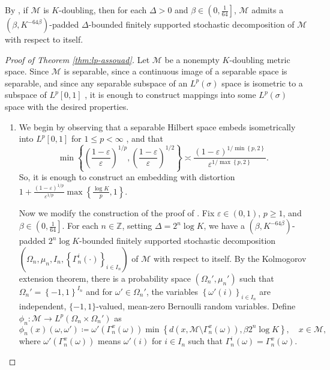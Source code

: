 \documentclass[11pt,reqno]{amsart}
\newcommand{\1}{\mathbf 1}
\begin{document}
By \cite[Lemma 2.2]{naor2012assouad}, if $\mathcal{M}$ is $K$-doubling, then for each $\Delta>0$ and $\beta\in \left(0,\frac{1}{64}\right]$, $\mathcal{M}$ admits a $\left(\beta,K^{-64\beta}\right)$-padded $\Delta$-bounded finitely supported stochastic decomposition of $\mathcal{M}$ with respect to itself.

\begin{proof}[Proof of Theorem \ref{thm:lp-assouad}]
Let $\mathcal{M}$ be a nonempty $K$-doubling metric space. Since $\mathcal{M}$ is separable, since a continuous image of a separable space is separable, and since any separable subspace of an $L^p\left(\sigma\right)$ space is isometric to a subspace of $L^p\left[0,1\right]$ \cite[Fact 1.20]{ostrovskii2013metric}, it is enough to construct mappings into some $L^p(\sigma)$ space with the desired properties.

\begin{enumerate}
    \item 
    We begin by observing that a separable Hilbert space embeds isometrically into $L^p[0,1]$ for $1\le p<\infty$ \cite[Proposition 6.4.13]{albiac2006topics}, and that
\[
\min\left\{\left(\frac{1-\varepsilon}{\varepsilon}\right)^{1/p},\left(\frac{1-\varepsilon}{\varepsilon}\right)^{1/2}\right\}\asymp \frac{(1-\varepsilon)^{1/\min\left\{p,2\right\}}}{\varepsilon^{1/\max\left\{p,2\right\}}}.
\]
So, it is enough to construct an embedding with distortion $1+\frac{\left(1-\varepsilon\right)^{1/p}}{\varepsilon^{1/p}}\max\left\{\frac{\log K}{p},1\right\}$.


Now we modify the construction of the proof of \cite[Theorem 5.1]{lee2005metric}. Fix $\varepsilon\in \left(0,1\right)$, $p\ge 1$, and $\beta\in \left(0,\frac{1}{64}\right]$. For each $n\in \mathbb{Z}$, setting $\Delta=2^n\log K$, we have a $\left(\beta,K^{-64\beta}\right)$-padded $2^n\log K$-bounded finitely supported stochastic decomposition $\left(\Omega_n,\mu_n,I_n,\left\{\Gamma_n^i\left(\cdot\right)\right\}_{i\in I_n}\right)$ of $\mathcal{M}$ with respect to itself. By the Kolmogorov extension theorem, there is a probability space $\left(\Omega_n',\mu_n'\right)$ such that $\Omega_n'=\left\{-1,1\right\}^{I_n}$ and for $\omega'\in \Omega_n'$, the variables $\left\{\omega'\left(i\right)\right\}_{i\in I_n}$ are independent, $\{-1,1\}$-valued, mean-zero Bernoulli random variables. Define $\phi_n:\mathcal{M}\to L^p\left(\Omega_n\times \Omega_n'\right)$
 as\[
\phi_n\left(x\right)\left(\omega,\omega'\right)\coloneqq \omega'\left(\Gamma^x_{n}\left(\omega\right)\right)\min\left\{d\left(x,\mathcal{M}\setminus \Gamma^x_n\left(\omega\right)\right),\beta 2^n\log K\right\},\quad x\in \mathcal{M},
\]
where $\omega'\left(\Gamma^x_n\left(\omega\right)\right)$ means $\omega'\left(i\right)$ for $i\in I_n$ such that $\Gamma_n^i\left(\omega\right)=\Gamma^x_n\left(\omega\right)$.


\end{enumerate}
\end{proof}
\end{document}
